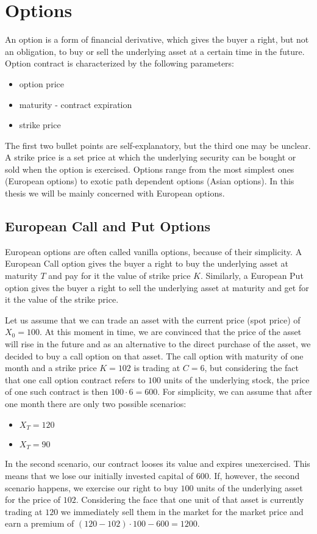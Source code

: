 \documentclass[times, utf8, diplomski]{fer}
\begin{document}
\section{Options}
An option is a form of financial derivative, which gives the buyer a right, but not an obligation, to buy or sell the underlying asset at a certain time in the future. Option contract is characterized by the following parameters:
\begin{itemize}
	\item option price
	\item maturity - contract expiration
	\item strike price
\end{itemize} The first two bullet points are self-explanatory, but the third one may be unclear. A strike price is a set price at which the underlying security can be bought or sold when the option is exercised. Options range from the most simplest ones (European options) to exotic path dependent options (Asian options). In this thesis we will be mainly concerned with European options.

\subsection{European Call and Put Options}
European options are often called vanilla options, because of their simplicity. A European Call option gives the buyer a right to buy the underlying asset at maturity $T$ and pay for it the value of strike price $K$. Similarly, a European Put option gives the buyer a right to sell the underlying asset at maturity and get for it the value of the strike price. 

\hfill \break
\indent Let us assume that we can trade an asset with the current price (spot price) of $X_0 = 100$. At this moment in time, we are convinced that the price of the asset will rise in the future and as an alternative to the direct purchase of the asset, we decided to buy a call option on that asset. The call option with maturity of one month and a strike price $K=102$ is trading at $C=6$, but considering the fact that one call option contract refers to $100$ units of the underlying stock, the price of one such contract is then $100 \cdot 6 = 600$. For simplicity, we can assume that after one month there are only two possible scenarios:
\begin{itemize}
	\item $X_T = 120$
	\item $X_T = 90$
\end{itemize} In the second scenario, our contract looses its value and expires unexercised. This means that we lose our initially invested capital of $600$. If, however, the second scenario happens, we exercise our right to buy $100$ units of the underlying asset for the price of $102$. Considering the face that one unit of that asset is currently trading at $120$ we immediately sell them in the market for the market price and earn a premium of $(120 - 102)\cdot 100 - 600 = 1200$.
\end{document}
